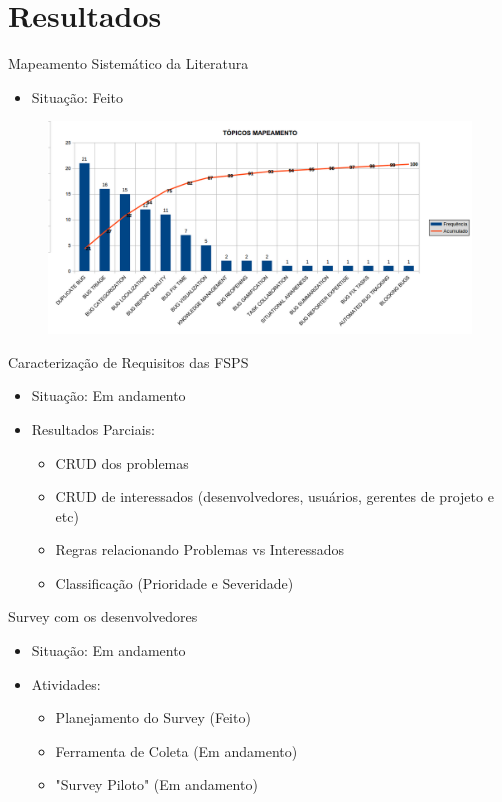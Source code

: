 \documentclass[t,14pt,mathserif]{beamer}
\begin{document}
\section{Resultados}

\begin{frame}{Mapeamento Sistemático da Literatura}

	\begin{itemize}
		\item Situação: Feito
    \end{itemize}

	\begin{figure}[hbtp]
		\centering
		\includegraphics[scale=.39]{../img/mapeamento.png}
	\end{figure}

\end{frame}

\begin{frame}{Caracterização de Requisitos das FSPS}
		\begin{itemize}
			\item Situação: Em andamento
			\item Resultados Parciais:
				\begin{itemize}
					 \item CRUD dos problemas
					 \item CRUD de interessados (desenvolvedores, usuários, gerentes de projeto e etc)
					 \item Regras relacionando Problemas vs Interessados
		             \item Classificação (Prioridade e Severidade)				
				\end{itemize}
	    \end{itemize}
\end{frame}

\begin{frame}{Survey com os desenvolvedores}
		\begin{itemize}
			\item Situação: Em andamento
			\item Atividades:
			\begin{itemize}
				\item Planejamento do Survey (Feito)
				\item Ferramenta de Coleta (Em andamento)
				\item "Survey Piloto" (Em andamento)
			\end{itemize}
		\end{itemize}
\end{frame}
\end{document}
